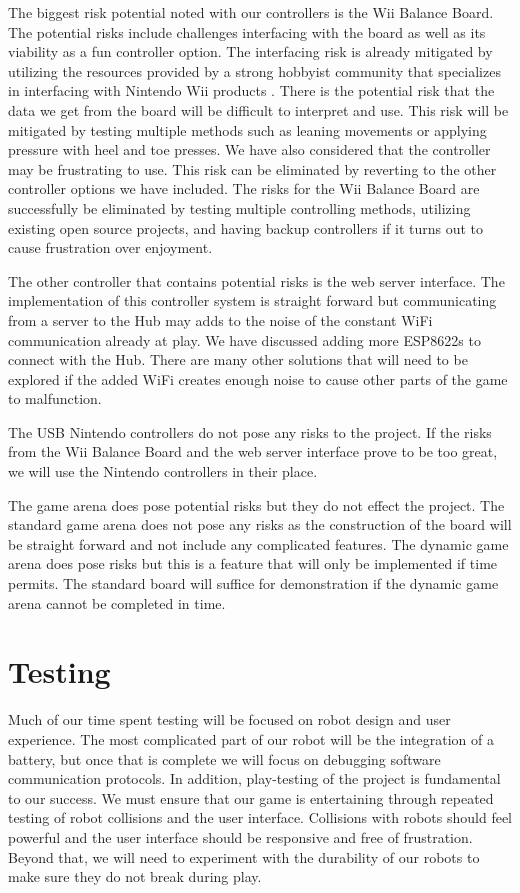 \documentclass[11pt]{ieeeconf}
\begin{document}
The biggest risk potential noted with our controllers is the Wii Balance Board. The potential risks include challenges interfacing with the board as well as its viability as a fun controller option. The interfacing risk is already mitigated by utilizing the resources provided by a strong hobbyist community that specializes in interfacing with Nintendo Wii products \cite{homebrew}. There is the potential risk that the data we get from the board will be difficult to interpret and use. This risk will be mitigated by testing multiple methods such as leaning movements or applying pressure with heel and toe presses. We have also considered that the controller may be frustrating to use. This risk can be eliminated by reverting to the other controller options we have included. The risks for the Wii Balance Board are successfully be eliminated by testing multiple controlling methods, utilizing existing open source projects, and having backup controllers if it turns out to cause frustration over enjoyment.

The other controller that contains potential risks is the web server interface. The implementation of this controller system is straight forward but communicating from a server to the Hub may adds to the noise of the constant WiFi communication already at play. We have discussed adding more ESP8622s to connect with the Hub. There are many other solutions that will need to be explored if the added WiFi creates enough noise to cause other parts of the game to malfunction.  

The USB Nintendo controllers do not pose any risks to the project. If the risks from the Wii Balance Board and the web server interface prove to be too great, we will use the Nintendo controllers in their place.  

The game arena does pose potential risks but they do not effect the project. The standard game arena does not pose any risks as the construction of the board will be straight forward and not include any complicated features. The dynamic game arena does pose risks but this is a feature that will only be implemented if time permits. The standard board will suffice for demonstration if the dynamic game arena cannot be completed in time.

\section{Testing}
Much of our time spent testing will be focused on robot design and user experience. The most complicated part of our robot will be the integration of a battery, but once that is complete we will focus on debugging software communication protocols. In addition, play-testing of the project is fundamental to our success. We must ensure that our game is entertaining through repeated testing of robot collisions and the user interface. Collisions with robots should feel powerful and the user interface should be responsive and free of frustration. Beyond that, we will need to experiment with the durability of our robots to make sure they do not break during play.
\end{document}
